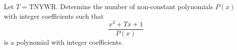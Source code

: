 Let $T=\text{TNYWR}$. Determine the number of non-constant polynomials $P\left(x\right)$ with integer coefficients such that \[\frac{x^3+Tx+1}{P\left(x\right)}\] is a polynomial with integer coefficients.